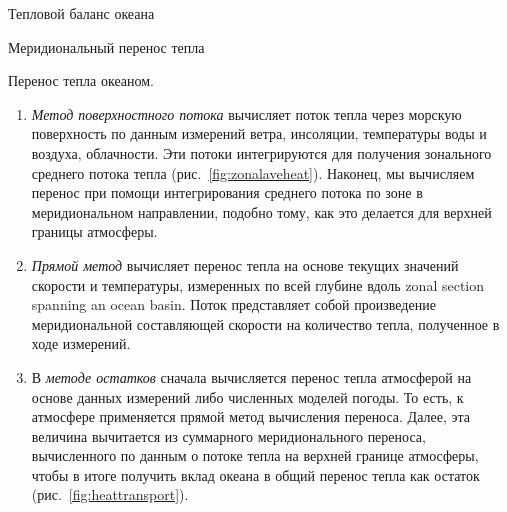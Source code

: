 \begin{chapter}{Тепловой баланс океана}
\begin{section}{Меридиональный перенос тепла}
\begin{paragraph}{Перенос тепла океаном.}
\begin{enumerate}
\item
\emph{Метод поверхностного потока} вычисляет поток тепла через морскую
поверхность по данным измерений ветра, инсоляции, температуры воды и воздуха,
облачности. Эти потоки интегрируются для получения зонального среднего потока
тепла (рис.~\ref{fig:zonalaveheat}). Наконец, мы вычисляем перенос при 
помощи интегрирования среднего потока по зоне в меридиональном направлении, 
подобно тому, как это делается для верхней границы атмосферы.
%

\item
\emph{Прямой метод} вычисляет перенос тепла на основе текущих значений 
скорости и температуры, измеренных по всей глубине вдоль zonal section 
spanning an ocean basin. Поток представляет собой произведение меридиональной
составляющей скорости на количество тепла, полученное в ходе измерений.
%

\item
В \emph{методе остатков} сначала вычисляется перенос тепла атмосферой на
основе данных измерений либо численных моделей погоды. То есть, к атмосфере
применяется прямой метод вычисления переноса. Далее, эта величина
вычитается из суммарного меридионального переноса, вычисленного по данным
о потоке тепла на верхней границе атмосферы, чтобы в итоге получить вклад
океана в общий перенос тепла как остаток (рис.~\ref{fig:heattransport}).
%
\end{enumerate}


\end{paragraph}
\end{section}
\end{chapter}
